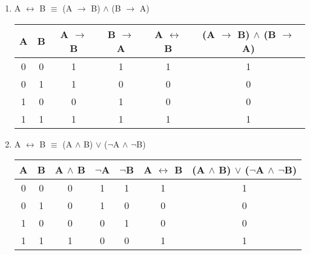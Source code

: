 \documentclass{report}
\begin{document}
\begin{enumerate}



  \item A $\leftrightarrow$ B $\equiv$ (A $\to$ B) $\land$ (B $\to$ A)



\begin{center}

  \begin{tabular} {| c | c | c | c | c | c |}

    \hline

    A & B & A $\to$ B & B $\to$ A & A $\leftrightarrow$ B & (A $\to$ B) $\land$ (B $\to$ A) \\ \hline

    0 & 0 & 1 & 1 & 1 & 1 \\

    0 & 1 & 1 & 0 & 0 & 0 \\

    1 & 0 & 0 & 1 & 0 & 0 \\

    1 & 1 & 1 & 1 & 1 & 1 \\ \hline

  \end{tabular} 

\end{center}



  \item A $\leftrightarrow$ B $\equiv$ (A $\land$ B) $\lor$ ($\neg$A $\land$ $\neg$B)



\begin{center}

  \begin{tabular} {| c | c | c | c | c | c | c |}

    \hline

    A & B & A $\land$ B & $\neg$A & $\neg$B & A $\leftrightarrow$ B & (A $\land$ B) $\lor$ ($\neg$A $\land$ $\neg$B) \\ \hline

    0 & 0 & 0 & 1 & 1 & 1 & 1 \\

    0 & 1 & 0 & 1 & 0 & 0 & 0 \\

    1 & 0 & 0 & 0 & 1 & 0 & 0 \\

    1 & 1 & 1 & 0 & 0 & 1 & 1 \\ \hline

  \end{tabular} 

\end{center}

\end{enumerate}
\end{document}
